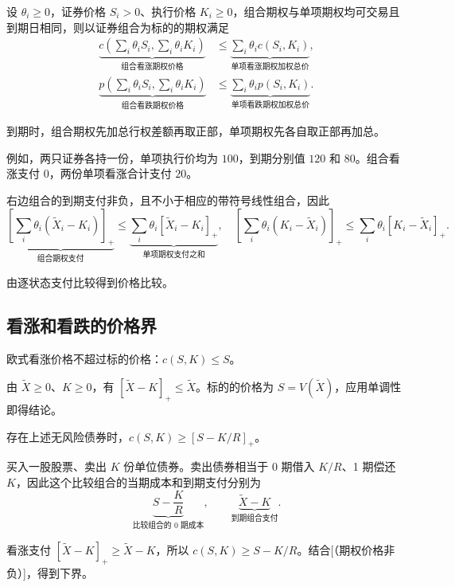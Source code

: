 \begin{tcolorbox}[knowledge]
设 $\theta_i\ge0$，证券价格 $S_i>0$、执行价格 $K_i\ge0$，组合期权与单项期权均可交易且到期日相同，则以证券组合为标的的期权满足
\[
 \begin{aligned}
 \underbrace{c\!\left(\sum_i\theta_iS_i,\sum_i\theta_iK_i\right)}_{\text{组合看涨期权价格}}
 &\le \underbrace{\sum_i\theta_i c(S_i,K_i)}_{\text{单项看涨期权加权总价}},\\
 \underbrace{p\!\left(\sum_i\theta_iS_i,\sum_i\theta_iK_i\right)}_{\text{组合看跌期权价格}}
 &\le \underbrace{\sum_i\theta_i p(S_i,K_i)}_{\text{单项看跌期权加权总价}}.
 \end{aligned}
\]

到期时，组合期权先加总行权差额再取正部，单项期权先各自取正部再加总。

例如，两只证券各持一份，单项执行价均为 $100$，到期分别值 $120$ 和 $80$。组合看涨支付 $0$，两份单项看涨合计支付 $20$。
\end{tcolorbox}
\begin{solution}[label-content={证明},blank-type=none]
右边组合的到期支付非负，且不小于相应的带符号线性组合，因此
\[
 \underbrace{\left[\sum_i\theta_i(\tilde X_i-K_i)\right]_+}_{\text{组合期权支付}}
 \le\underbrace{\sum_i\theta_i[\tilde X_i-K_i]_+}_{\text{单项期权支付之和}},
 \quad
 \left[\sum_i\theta_i(K_i-\tilde X_i)\right]_+
 \le\sum_i\theta_i[K_i-\tilde X_i]_+.
\]

由逐状态支付比较得到价格比较。
\end{solution}

\subsection{看涨和看跌的价格界}
\begin{tcolorbox}[knowledge]
欧式看涨价格不超过标的价格：$c(S,K)\le S$。
\end{tcolorbox}
\begin{solution}[label-content={证明},blank-type=none]
由 $\tilde X\ge0$、$K\ge0$，有 $[\tilde X-K]_+\le\tilde X$。标的的价格为 $S=V(\tilde X)$，应用单调性即得结论。
\end{solution}

\begin{tcolorbox}[knowledge]
存在上述无风险债券时，$c(S,K)\ge[S-K/R]_+$。
\end{tcolorbox}
\begin{solution}[label-content={证明},blank-type=none]
买入一股股票、卖出 $K$ 份单位债券。卖出债券相当于 0 期借入 $K/R$、1 期偿还 $K$，因此这个比较组合的当期成本和到期支付分别为
\[
 \underbrace{S-\frac K R}_{\text{比较组合的 0 期成本}},\qquad
 \underbrace{\tilde X-K}_{\text{到期组合支付}}.
\]

看涨支付 $[\tilde X-K]_+\ge\tilde X-K$，所以 $c(S,K)\ge S-K/R$。结合[（期权价格非负）]，得到下界。
\end{solution}

